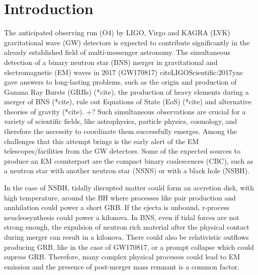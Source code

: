 \section{Introduction}

The anticipated observing run (O4) by LIGO, Virgo and KAGRA (LVK) gravitational wave (GW) detectors is expected to contribute significantly in the already established field of multi-messenger astronomy. The simultaneous detection of a binary neutron star (BNS) merger in gravitational and electromagnetic (EM) waves in 2017 (GW170817) cite{LIGOScientific:2017ync} gave answers to long-lasting problems, such as the origin and production of Gamma Ray Bursts (GRBs) (*cite), the production of heavy elements during a merger of BNS (*cite), rule out Equations of State (EoS) (*cite) and alternative theories of gravity (*cite). +? Such simultaneous observations are crucial for a variety of scientific fields, like astrophysics, particle physics, cosmology, and therefore the necessity to coordinate them successfully emerges. Among the challenges that this attempt brings is the early alert of the EM telescopes/facilities from the GW detectors. Some of the expected sources to produce an EM counterpart are the compact binary coalescences (CBC), such as a neutron star with another neutron star (NSNS) or with a black hole (NSBH).  

In the case of NSBH, tidally disrupted matter could form an accretion disk, with high temperature, around the BH where processes like pair production and annhilation could power a short GRB. If the ejecta is unbound, r-process neucleosynthesis could power a kilonova. In BNS, even if tidal forces are not strong enough, the expulsion of neutron rich material after the physical contact during merger can result in a kilonova. There could also be relativistic outflows producing GRB, like in the case of GW170817, or a prompt collapse which could supress GRB. Therefore, many complex physical processes could lead to EM emission and the presence of post-merger mass remnant is a common factor.

